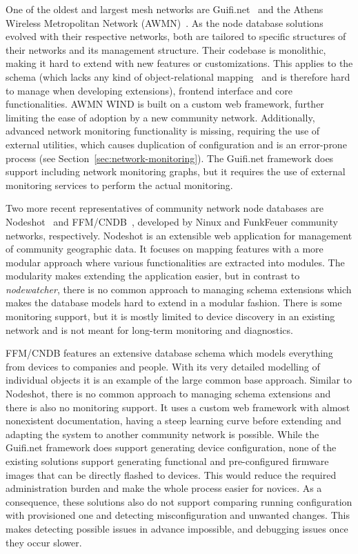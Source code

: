 \documentclass[5p,sort&compress]{elsarticle}
\newcommand{\nodewatcher}{\textit{nodewatcher}}
\begin{document}
One of the oldest and largest mesh networks are Guifi.net~\cite{Guifinode_2003,Vega_2012} and the Athens Wireless Metropolitan Network (AWMN)~\cite{AWMN_WIND_2002}.
As the node database solutions evolved with their respective networks, both are tailored to specific structures of their networks and its management structure.
Their codebase is monolithic, making it hard to extend with new features or customizations.
This applies to the schema (which lacks any kind of object-relational mapping~\cite{ONeil_2008} and is therefore hard to manage when developing extensions), frontend interface and core functionalities.
AWMN WIND is built on a custom web framework, further limiting the ease of adoption by a new community network.
Additionally, advanced network monitoring functionality is missing, requiring the use of external utilities, which causes duplication of configuration and is an error-prone process (see Section~\ref{sec:network-monitoring}).
The Guifi.net framework does support including network monitoring graphs, but it requires the use of external monitoring services to perform the actual monitoring.

Two more recent representatives of community network node databases are Nodeshot~\cite{Nodeshot_2012} and FFM/CNDB~\cite{Funkfeuer_2012}, developed by Ninux and FunkFeuer community networks, respectively.
Nodeshot is an extensible web application for management of community geographic data.
It focuses on mapping features with a more modular approach where various functionalities are extracted into modules.
The modularity makes extending the application easier, but in contrast to \nodewatcher{}, there is no common approach to managing schema extensions which makes the database models hard to extend in a modular fashion.
There is some monitoring support, but it is mostly limited to device discovery in an existing network and is not meant for long-term monitoring and diagnostics.

FFM/CNDB features an extensive database schema which models everything from devices to companies and people.
With its very detailed modelling of individual objects it is an example of the large common base approach.
Similar to Nodeshot, there is no common approach to managing schema extensions and there is also no monitoring support.
It uses a custom web framework with almost nonexistent documentation, having a steep learning curve before extending and adapting the system to another community network is possible.
While the Guifi.net framework does support generating device configuration, none of the existing solutions support generating functional and pre-configured firmware images that can be directly flashed to devices.
This would reduce the required administration burden and make the whole process easier for novices.
As a consequence, these solutions also do not support comparing running configuration with provisioned one and detecting misconfiguration and unwanted changes.
This makes detecting possible issues in advance impossible, and debugging issues once they occur slower.
\end{document}

